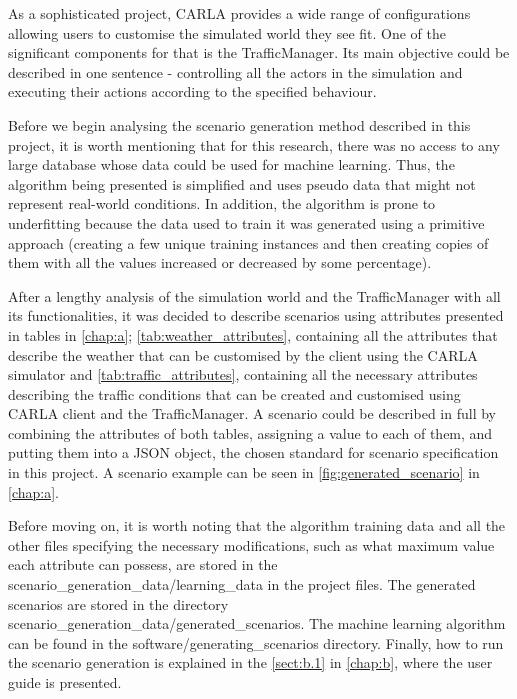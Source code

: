As a sophisticated project, CARLA provides a wide range of configurations allowing users to customise the simulated world they see fit. One of the significant components for that is the TrafficManager. Its main objective could be described in one sentence - controlling all the actors in the simulation and executing their actions according to the specified behaviour.

Before we begin analysing the scenario generation method described in this project, it is worth mentioning that for this research, there was no access to any large database whose data could be used for machine learning. Thus, the algorithm being presented is simplified and uses pseudo data that might not represent real-world conditions. In addition, the algorithm is prone to underfitting because the data used to train it was generated using a primitive approach (creating a few unique training instances and then creating copies of them with all the values increased or decreased by some percentage).

After a lengthy analysis of the simulation world and the TrafficManager with all its functionalities, it was decided to describe scenarios using attributes presented in tables in \autoref{chap:a}; \autoref{tab:weather_attributes}, containing all the attributes that describe the weather that can be customised by the client using the CARLA simulator and \autoref{tab:traffic_attributes}, containing all the necessary attributes describing the traffic conditions that can be created and customised using CARLA client and the TrafficManager. A scenario could be described in full by combining the attributes of both tables, assigning a value to each of them, and putting them into a JSON object, the chosen standard for scenario specification in this project. A scenario example can be seen in \autoref{fig:generated_scenario} in \autoref{chap:a}.

Before moving on, it is worth noting that the algorithm training data and all the other files specifying the necessary modifications, such as what maximum value each attribute can possess, are stored in the scenario\_generation\_data/learning\_data in the project files. The generated scenarios are stored in the directory scenario\_generation\_data/generated\_scenarios. The machine learning algorithm can be found in the software/generating\_scenarios directory. Finally, how to run the scenario generation is explained in the \autoref{sect:b.1} in \autoref{chap:b}, where the user guide is presented.

